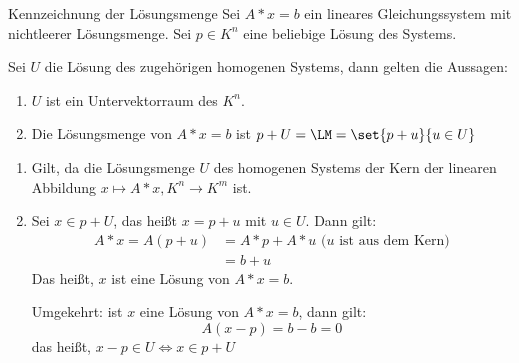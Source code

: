 \begin{satz}{Kennzeichnung der Lösungsmenge}
	Sei $A*x=b$ ein lineares Gleichungssystem mit nichtleerer Lösungsmenge. Sei $p\in K^n$ eine beliebige Lösung des Systems.

	Sei $U$ die Lösung des zugehörigen homogenen Systems, dann gelten die Aussagen:

	\begin{enumerate}
		\item $U$ ist ein Untervektorraum des $K^n$.
		\item Die Lösungsmenge von $A*x=b$ ist $p+U=\LM=\set{p+u}{u\in U}$
	\end{enumerate}
\end{satz}
\begin{beweis}
	\begin{enumerate}
		\item Gilt, da die Lösungsmenge $U$ des homogenen Systems der Kern der linearen Abbildung $x\mapsto A*x, K^n\rightarrow K^m$ ist.
		\item Sei $x\in p+U$, das heißt $x=p+u$ mit $u\in U$. Dann gilt:
		\begin{align*}
			A*x=A(p+u)&=A*p+A*u \text{ ($u$ ist aus dem Kern)}\\
								&=b+u
		\end{align*}
		Das heißt, $x$ ist eine Lösung von $A*x=b$.

		Umgekehrt: ist $x$ eine Lösung von $A*x=b$, dann gilt:
		\begin{equation*}
			A(x-p)=b-b=0
		\end{equation*}
		das heißt,  $x-p\in U\Leftrightarrow x\in p+U$
	\end{enumerate}
\end{beweis}

